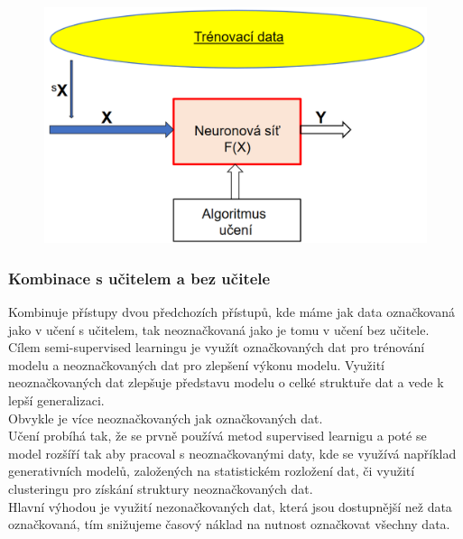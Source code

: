 \begin{figure}[h!]
    \includegraphics[scale = 0.3]{images/bezUcitele.png}
\end{figure}

\subsubsection{Kombinace s učitelem a bez učitele}
Kombinuje přístupy dvou předchozích přístupů, kde máme jak data označkovaná jako v učení s učitelem, tak neoznačkovaná jako je tomu v učení bez učitele.\\

Cílem semi-supervised learningu je využít označkovaných dat pro trénování modelu a neoznačkovaných dat pro zlepšení výkonu modelu. Využití neoznačkovaných dat zlepšuje představu modelu o celké struktuře dat a vede k lepší generalizaci.\\

Obvykle je více neoznačkovaných jak označkovaných dat.\\

Učení probíhá tak, že se prvně používá metod supervised learnigu a poté se model rozšíří tak aby pracoval s neoznačkovanými daty, kde se využívá například generativních modelů, založených na statistickém rozložení dat, či využití clusteringu pro získání struktury neoznačkovaných dat.\\

Hlavní výhodou je využití nezonačkovaných dat, která jsou dostupnější než data označkovaná, tím snižujeme časový náklad na nutnost označkovat všechny data.\\

